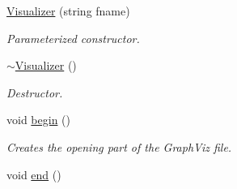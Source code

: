 \begin{DoxyCompactItemize}
\hyperlink{classVisualizer_a65d978447073196b110504d33bff34c5}{Visualizer} (string fname)
\begin{DoxyCompactList}\small\item\em Parameterized constructor. \end{DoxyCompactList}\item 
\hyperlink{classVisualizer_a013ec3101407fbe4805f289bc32d1265}{$\sim$\-Visualizer} ()
\begin{DoxyCompactList}\small\item\em Destructor. \end{DoxyCompactList}\item 
\hypertarget{classVisualizer_abf6c6d4ce88207fa564ad6238c263aca}{void \hyperlink{classVisualizer_abf6c6d4ce88207fa564ad6238c263aca}{begin} ()}\label{classVisualizer_abf6c6d4ce88207fa564ad6238c263aca}

\begin{DoxyCompactList}\small\item\em Creates the opening part of the Graph\-Viz file. \end{DoxyCompactList}\item 
\hypertarget{classVisualizer_a89da5b4fd09be3beac4c49067fa5cd73}{void \hyperlink{classVisualizer_a89da5b4fd09be3beac4c49067fa5cd73}{end} ()}\label{classVisualizer_a89da5b4fd09be3beac4c49067fa5cd73}


\end{DoxyCompactItemize}
